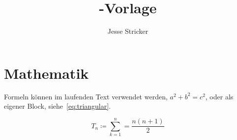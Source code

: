 \documentclass{scrartcl}
\title{\XeLaTeX-Vorlage}
\author{Jesse Stricker}
\date{\DTMdate{2000-01-01}}
\begin{document}
\maketitle

\section{Mathematik}

Formeln können im laufenden Text verwendet werden, \(a^2 + b^2 = c^2\),
oder als eigener Block, siehe~\cref{eq:triangular}.

\begin{equation}
  \label{eq:triangular}
  T_n \coloneqq \sum^{n}_{k=1} = \frac{n(n+1)}{2}
\end{equation}
\end{document}

